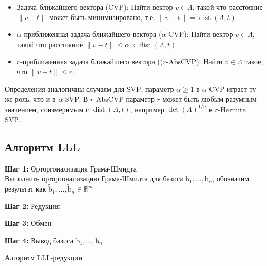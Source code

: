 \begin{itemize}
      \begin{itemize}
          \item Задача ближайшего вектора (CVP): Найти вектор $v\in\Lambda$,
              такой что расстояние $\lVert v - t\rVert$ может быть минимизировано,
              т.е. $\lVert v - t\rVert = \operatorname{dist}(\Lambda,t)$.
          \item $\alpha$-приближенная задача ближайшего вектора ($\alpha$‑CVP):
              Найти вектор $v\in\Lambda$, такой что расстояние
              $\lVert v - t\rVert \le \alpha \times \operatorname{dist}(\Lambda,t)$
          \item $r$-приближенная задача ближайшего вектора (($r$‑AbsCVP):  Найти
              $v\in\Lambda$ такое, что $\lVert v - t\rVert \le r$.
      \end{itemize}

      Определения аналогичны случаям для SVP; параметр $\alpha\ge1$ в
      $\alpha$‑CVP играет ту же роль, что и в $\alpha$‑SVP. В $r$‑AbsCVP
      параметр $r$ может быть любым разумным значением, соизмеримым с
      $\operatorname{dist}(\Lambda,t)$, например $\det(\Lambda)^{1/n}$ в
      $r$‑Hermite SVP.
\end{itemize}

\subsection*{Алгоритм LLL}
\begin{algorithm}[htp!]
    \SetAlgoLined


    \textbf{Шаг 1:} Орторгонализация Грама-Шмидта \\
    Выполнить орторгонализацию Грама-Шмидта для базиса $\text{b}_1, \dots, \text{b}_n$, обозначим результат как $\tilde{\text{b}}_1, \dots, \tilde{\text{b}}_n \in \mathbb{R}^m$

    \textbf{Шаг 2:} Редукция


    \textbf{Шаг 3:} Обмен


    \textbf{Шаг 4:} Вывод базиса $\text{b}_1, \dots, \text{b}_n$

    \caption{Алгоритм LLL-редукции}
    \label{alg:lll}
\end{algorithm}

